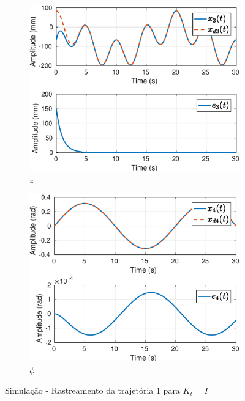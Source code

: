 \begin{figure}[H]
\begin{subfigure}{.5\textwidth}
  \centering
  \includegraphics[width=\linewidth]{./img/simul_delay_zoh1/x3.eps}
  \caption{$z$}
  \label{fig:simul_traj1_x3}
\end{subfigure}%
\begin{subfigure}{.5\textwidth}
  \centering
  \includegraphics[width=\linewidth]{./img/simul_delay_zoh1/x4.eps}
  \caption{$\phi$}
  \label{fig:simul_traj1_x4}
\end{subfigure}
\caption{Simulação - Rastreamento da trajetória 1 para ${K}_t = {I}$}
\label{fig:simulx}
\end{figure}

